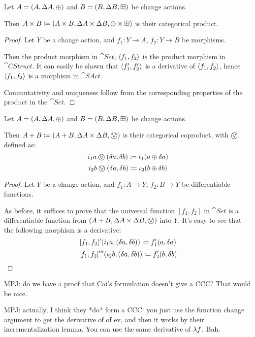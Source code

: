 \begin{prop}[Products]
  Let $A = (A,\Delta A,\oplus)$ and $B =
  (B,\Delta B,\boxplus)$ be change actions.

  Then $A \times B \coloneqq (A \times B,\Delta A \times
  \Delta B,\oplus \times \boxplus)$ is their categorical product.
\end{prop}
\begin{proof}
  Let $Y$ be a change action, and $f_1: Y \rightarrow A$, $f_2: Y
  \rightarrow B$ be morphisms.

  Then the product morphism in $\cat{Set}$, $\left\langle {f_1}, {f_2} \right\rangle$ is the product
  morphism in $\cat{CStruct}$. It can easily be
  shown that $\left\langle {f_1'}, {f_2'} \right\rangle$ is a derivative of $\left\langle {f_1}, {f_2} \right\rangle$,
  hence $\left\langle {f_1}, {f_2} \right\rangle$ is a morphism in $\cat{SAct}$.

  Commutativity and uniqueness follow from the corresponding properties of the
  product in the $\cat{Set}$.
\end{proof}

\begin{prop}[Coproducts]
  Let $A = (A,\Delta A,\oplus)$ and $B =
  (B,\Delta B,\boxplus)$ be change actions.

  Then $A + B \defeq \cstruct{A + B}{\changes{A} \times
  \changes{B}}{\cplusvee}$ is their categorical coproduct, with $\cplusvee$ defined as:
  $$i_1 a \cplusvee (\change{a}, \change{b}) \defeq \iota_1 (a \cplus \change{a})$$
  $$i_2 b \cplusvee (\change{a}, \change{b}) \defeq \iota_2 (b \cplus \change{b})$$
\end{prop}
\begin{proof}
  Let $Y$ be a change action, and $f_1 : A \rightarrow Y$, $f_2 : B
  \rightarrow Y$ be differentiable functions.

  As before, it suffices to prove that the universal function $[f_1, f_2]$ in $\cat{Set}$ is a differentiable
  function from $\cstruct{A + B}{\changes{A} \times \changes{B}}{\cplusvee}$ into $Y$. It's easy to see 
  that the following morphism is a derivative:
  $$[f_1, f_2]' (i_1 a, (\delta a, \delta b)) \coloneqq f_1'(a, \delta a)$$
  $$[f_1, f_2]''' (i_2 b, (\delta a, \delta b)) \coloneqq f_2'(b, \delta b)$$
\end{proof}

MPJ: do we have a proof that Cai's formulation doesn't give a CCC? That would be
nice.

MPJ: actually, I think they *do* form a CCC: you just use the function change
argument to get the derivative of of ev, and then it works by their
incrementalization lemma. You can use the same derivative of $\lambda f$. Bah.

